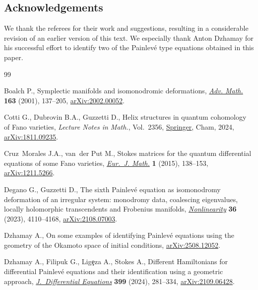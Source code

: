 \documentclass[pdftex]{sigma}
\numberwithin{equation}{section}
\begin{document}
\subsection*{Acknowledgements} We thank the referees for their work and suggestions, resulting in a considerable revision of
an earlier version of this text. We especially thank Anton Dzhamay for his successful effort to identify two of the Painlev\'e type
equations obtained in this paper.

\begin{thebibliography}{99}
\footnotesize\itemsep=0pt

Boalch P., Symplectic manifolds and isomonodromic deformations,
 \href{https://doi.org/10.1006/aima.2001.1998}{\textit{Adv. Math.}}
 \textbf{163} (2001), 137--205,
 \href{http://arxiv.org/abs/2002.00052}{arXiv:2002.00052}.

Cotti G., Dubrovin B.A., Guzzetti D., Helix structures in quantum cohomology of
 {F}ano varieties, \textit{Lecture Notes in Math.}, Vol.~2356,
 \href{https://doi.org/10.1007/978-3-031-69067-9}{Springer}, Cham, 2024,
 \href{http://arxiv.org/abs/1811.09235}{arXiv:1811.09235}.

Cruz~Morales J.A., van~der Put M., Stokes matrices for the quantum differential
 equations of some {F}ano varieties,
 \href{https://doi.org/10.1007/s40879-014-0012-6}{\textit{Eur.~J. Math.}}
 \textbf{1} (2015), 138--153,
 \href{http://arxiv.org/abs/1211.5266}{arXiv:1211.5266}.

Degano G., Guzzetti D., The sixth {P}ainlev\'e equation as isomonodromy
 deformation of an irregular system: monodromy data, coalescing eigenvalues,
 locally holomorphic transcendents and {F}robenius manifolds,
 \href{https://doi.org/10.1088/1361-6544/acdc7a}{\textit{Nonlinearity}}
 \textbf{36} (2023), 4110--4168,
 \href{http://arxiv.org/abs/2108.07003}{arXiv:2108.07003}.

Dzhamay A., {O}n some examples of identifying {P}ainlev\'e equations using the
 geometry of the {O}kamoto space of initial conditions,
 \href{http://arxiv.org/abs/2508.12052}{arXiv:2508.12052}.

Dzhamay A., Filipuk G., Lig\c{e}za A., Stokes A., Different {H}amiltonians for
 differential {P}ainlev\'e equations and their identification using a
 geometric approach,
 \href{https://doi.org/10.1016/j.jde.2024.03.029}{\textit{J.~Differential
 Equations}} \textbf{399} (2024), 281--334,
 \href{http://arxiv.org/abs/2109.06428}{arXiv:2109.06428}.


\end{thebibliography}
\end{document}

